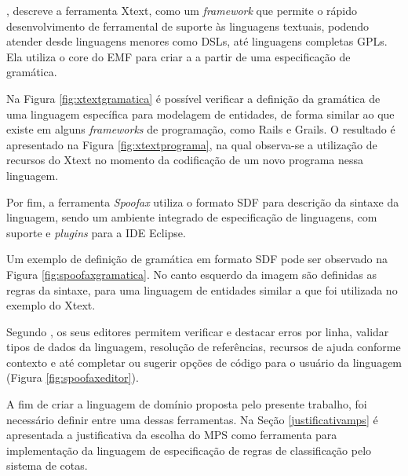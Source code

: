 , descreve a ferramenta Xtext, como um \textit{framework} que permite o rápido desenvolvimento de ferramental de suporte às linguagens textuais, podendo atender desde linguagens menores como \gls{DSL}s, até linguagens completas \gls{GPL}s. Ela utiliza o core do \gls{EMF} para criar a  a partir de uma especificação de gramática. 

Na Figura \ref{fig:xtextgramatica} é possível verificar a definição da gramática de uma linguagem específica para modelagem de entidades, de forma similar ao que existe em alguns \textit{frameworks} de programação, como Rails e Grails. O resultado é apresentado na Figura \ref{fig:xtextprograma}, na qual observa-se a utilização de recursos do Xtext no momento da codificação de um novo programa nessa linguagem.





\newpage
Por fim, a ferramenta \textit{Spoofax} utiliza o formato \gls{SDF} para descrição da sintaxe da linguagem, sendo um ambiente integrado de especificação de linguagens, com suporte e \textit{plugins} para a \gls{IDE} Eclipse. 

Um exemplo de definição de gramática em formato \gls{SDF} pode ser observado na Figura \ref{fig:spoofaxgramatica}. No canto esquerdo da imagem são definidas as regras da sintaxe, para uma linguagem de entidades similar a que foi utilizada no exemplo do Xtext. 




Segundo , os seus editores permitem verificar e destacar erros por linha, validar tipos de dados da linguagem, resolução de referências, recursos de ajuda conforme contexto e até completar ou sugerir opções de código para o usuário da linguagem (Figura \ref{fig:spoofaxeditor}). 



A fim de criar a linguagem de domínio proposta pelo presente trabalho, foi necessário definir entre uma dessas ferramentas. Na Seção \ref{justificativamps} é apresentada a justificativa da escolha do \gls{MPS} como ferramenta para implementação da linguagem de especificação de regras de classificação pelo sistema de cotas.